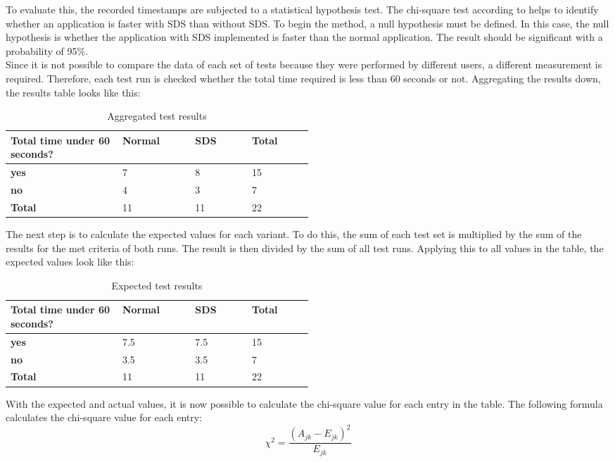 To evaluate this, the recorded timestamps are subjected to a statistical hypothesis test. The chi-square test according to \citeauthor{pearson_x_1900} helps to identify whether an application is faster with SDS than without SDS. To begin the method, a null hypothesis must be defined. In this case, the null hypothesis is whether the application with SDS implemented is faster than the normal application. The result should be significant with a probability of 95\%. \cite{pearson_x_1900} \\ 
Since it is not possible to compare the data of each set of tests because they were performed by different users, a different measurement is required. Therefore, each test run is checked whether the total time required is less than 60 seconds or not. Aggregating the results down, the results table looks like this:
\begin{table}[ht]
    \centering
    \begin{tabular}{|p{0.2\linewidth} || p{0.1\linewidth}|p{0.1\linewidth}|p{0.1\linewidth}|}
        \hline
        \textbf{Total time under 60 seconds?} &\textbf{Normal}&\textbf{\ac{SDS}}&\textbf{Total} \\ \hline\hline
        \textbf{yes} & 7 & 8 & 15 \\ \hline
        \textbf{no} & 4 & 3 & 7 \\ \hline
        \textbf{Total} & 11 & 11 & 22 \\ \hline
    \end{tabular}
    \caption{\label{tab:chi-square} Aggregated test results}
\end{table}
The next step is to calculate the expected values for each variant. To do this, the sum of each test set is multiplied by the sum of the results for the met criteria of both runs. The result is then divided by the sum of all test runs. Applying this to all values in the table, the expected values look like this:
\begin{table}[ht]
    \centering
    \begin{tabular}{|p{0.2\linewidth} || p{0.1\linewidth}|p{0.1\linewidth}|p{0.1\linewidth}|}
        \hline
        \textbf{Total time under 60 seconds?} &\textbf{Normal}&\textbf{\ac{SDS}}&\textbf{Total} \\ \hline\hline
        \textbf{yes} & 7.5 & 7.5 & 15 \\ \hline
        \textbf{no} & 3.5 & 3.5 & 7 \\ \hline
        \textbf{Total} & 11 & 11 & 22 \\ \hline
    \end{tabular}
    \caption{\label{tab:chi-square-expected} Expected test results}
\end{table}
With the expected and actual values, it is now possible to calculate the chi-square value for each entry in the table. The following formula calculates the chi-square value for each entry:
\[\chi^2=\frac{(A_{jk} - E_{jk})^2}{E_{jk}}\]

